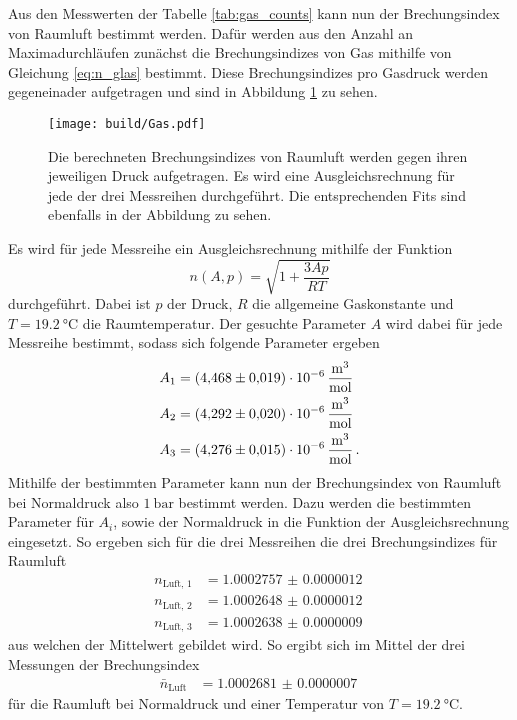 \FloatBarrier
Aus den Messwerten der Tabelle \ref{tab:gas_counts} kann nun der Brechungsindex von Raumluft bestimmt werden.
Dafür werden aus den Anzahl an Maximadurchläufen zunächst die Brechungsindizes von Gas mithilfe von Gleichung \eqref{eq:n_glas} bestimmt.
Diese Brechungsindizes pro Gasdruck werden gegeneinader aufgetragen und sind in Abbildung \ref{fig:n_glass} zu sehen.
\begin{figure}
    \centering 
    \texttt{[image: build/Gas.pdf]}
    \caption{Die berechneten Brechungsindizes von Raumluft werden gegen ihren jeweiligen Druck aufgetragen.
    Es wird eine Ausgleichsrechnung für jede der drei Messreihen durchgeführt.
    Die entsprechenden Fits sind ebenfalls in der Abbildung zu sehen.}
    \label{fig:n_glass}
\end{figure}
Es wird für jede Messreihe ein Ausgleichsrechnung mithilfe der Funktion
\begin{equation*}
    n(A,p) =  \sqrt{1 + \frac{3Ap}{RT}}
\end{equation*}
durchgeführt.
Dabei ist $p$ der Druck, $R$ die allgemeine Gaskonstante und $T=\SI{19.2}{\celsius}$ die Raumtemperatur.
Der gesuchte Parameter $A$ wird dabei für jede Messreihe bestimmt, sodass sich folgende Parameter ergeben
\begin{align*}
    A_1 &= \SI{4.468(19)e-6}{\frac{\cubic\meter}{\mol}} \\
    A_2 &= \SI{4.292(20)e-6}{\frac{\cubic\meter}{\mol}} \\
    A_3 &= \SI{4.276(15)e-6}{\frac{\cubic\meter}{\mol}} \, .
\end{align*}
Mithilfe der bestimmten Parameter kann nun der Brechungsindex von Raumluft bei Normaldruck also $\SI{1}{\bar}$ bestimmt werden.
Dazu werden die bestimmten Parameter für $A_i$, sowie der Normaldruck in die Funktion der Ausgleichsrechnung eingesetzt.
So ergeben sich für die drei Messreihen die drei Brechungsindizes für Raumluft
\begin{align*}
    n_\text{Luft, 1} &= \SI{1.0002757(12)}{}\\
    n_\text{Luft, 2} &= \SI{1.0002648(12)}{}\\
    n_\text{Luft, 3} &= \SI{1.0002638(09)}{}
\end{align*}
aus welchen der Mittelwert gebildet wird.
So ergibt sich im Mittel der drei Messungen der Brechungsindex
\begin{align*}
    \bar{n}_\text{Luft} &= \SI{1.0002681(07)}{}
\end{align*}
für die Raumluft bei Normaldruck und einer Temperatur von $T=\SI{19.2}{\celsius}$.

